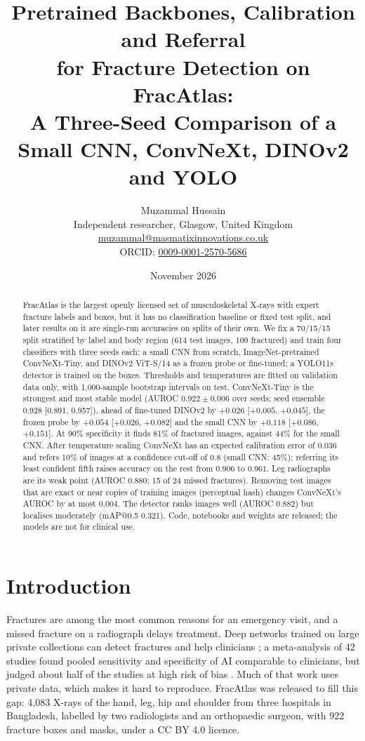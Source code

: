 \documentclass[11pt,a4paper]{article}
\title{\textbf{Pretrained Backbones, Calibration and Referral\\for Fracture Detection on FracAtlas:\\A Three-Seed Comparison of a Small CNN, ConvNeXt, DINOv2 and YOLO}}
\author{Muzammal Hussain\\
\small Independent researcher, Glasgow, United Kingdom\\
\small \href{mailto:muzammal@masmatixinnovations.co.uk}{muzammal@masmatixinnovations.co.uk}\\
\small ORCID: \href{https://orcid.org/0009-0001-2570-5686}{0009-0001-2570-5686}}
\date{\small November 2026}
\begin{document}
\maketitle

\begin{abstract}
\noindent
FracAtlas is the largest openly licensed set of musculoskeletal X-rays with expert fracture labels and boxes, but it
has no classification baseline or fixed test split, and later results on it are single-run accuracies on splits of
their own. We fix a 70/15/15 split stratified by label and body region (614 test images, 109 fractured) and train four
classifiers with three seeds each: a small CNN from scratch, ImageNet-pretrained ConvNeXt-Tiny, and DINOv2 ViT-S/14 as
a frozen probe or fine-tuned; a YOLO11s detector is trained on the boxes. Thresholds and temperatures are fitted on
validation data only, with 1,000-sample bootstrap intervals on test. ConvNeXt-Tiny is the strongest and most stable
model (AUROC $0.922 \pm 0.006$ over seeds; seed ensemble 0.928 [0.891, 0.957]), ahead of fine-tuned DINOv2 by
$+0.026$ [$+0.005$, $+0.045$], the frozen probe by $+0.054$ [$+0.026$, $+0.082$] and the small CNN by $+0.118$
[$+0.086$, $+0.151$]. At 90\% specificity it finds 81\% of fractured images, against 44\% for the small CNN.
After temperature scaling ConvNeXt has an expected
calibration error of 0.036 and refers 10\% of images at a confidence cut-off of 0.8 (small CNN: 45\%); referring its
least confident fifth raises accuracy on the rest from 0.906 to 0.961. Leg radiographs are its weak point (AUROC
0.880; 15 of 24 missed fractures). Removing test images that are exact or near copies of training images (perceptual
hash) changes ConvNeXt's AUROC by at most 0.004. The detector ranks images well (AUROC 0.882) but localises moderately (mAP@0.5
0.321). Code, notebooks and weights are released; the models are not for clinical use.
\end{abstract}

\section{Introduction}

Fractures are among the most common reasons for an emergency visit, and a missed fracture on a radiograph delays
treatment. Deep networks trained on large private collections can detect fractures and help clinicians
\citep{lindsey2018fracture}; a meta-analysis of 42 studies found pooled sensitivity and specificity of AI comparable
to clinicians, but judged about half of the studies at high risk of bias \citep{kuo2022fracture}. Much of that work
uses private data, which makes it hard to reproduce. FracAtlas \citep{abedeen2023fracatlas} was released to fill this
gap: 4,083 X-rays of the hand, leg, hip and shoulder from three hospitals in Bangladesh, labelled by two radiologists
and an orthopaedic surgeon, with 922 fracture boxes and masks, under a CC BY 4.0 licence.
\end{document}
